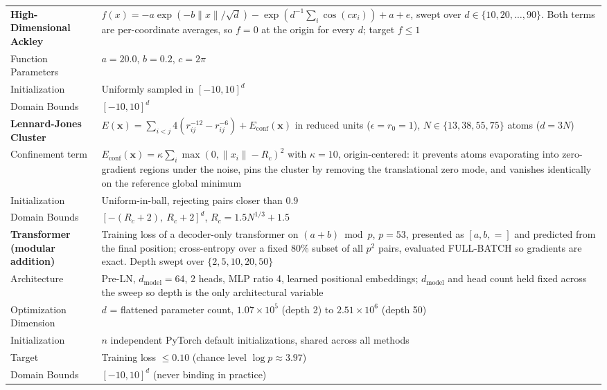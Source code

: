 \documentclass{article}
\theoremstyle{plain}
\theoremstyle{definition}
\theoremstyle{remark}
\newcommand{\xx}{\mathbf{x}}
\begin{document}
\begin{table}[!htbp]
\begin{tabular}{@{}lp{}@{}}
\midrule
\textbf{High-Dimensional Ackley} & $f(x)=-a\exp(-b\lVert x\rVert/\sqrt{d})-\exp(d^{-1}\sum_i\cos(cx_i))+a+e$, swept over $d\in\{10,20,\dots,90\}$. Both terms are per-coordinate averages, so $f=0$ at the origin for every $d$; target $f\le1$ \\
Function Parameters & $a=20.0$, $b=0.2$, $c=2\pi$ \\
Initialization & Uniformly sampled in $[-10, 10]^d$ \\
Domain Bounds & $[-10, 10]^d$ \\
\midrule
\textbf{Lennard-Jones Cluster} & $E(\xx) = \sum_{i<j} 4(r_{ij}^{-12} - r_{ij}^{-6}) + E_{\text{conf}}(\xx)$ in reduced units ($\epsilon=r_0=1$), $N \in \{13, 38, 55, 75\}$ atoms ($d=3N$) \\
Confinement term & $E_{\text{conf}}(\xx) = \kappa\sum_i \max(0,\|x_i\|-R_c)^2$ with $\kappa=10$, origin-centered: it prevents atoms evaporating into zero-gradient regions under the noise, pins the cluster by removing the translational zero mode, and vanishes identically on the reference global minimum \\
Initialization & Uniform-in-ball, rejecting pairs closer than 0.9 \\
Domain Bounds & $[-(R_c+2),\ R_c+2]^d$, $R_c = 1.5 N^{1/3} + 1.5$ \\
\midrule
\textbf{Transformer (modular addition)} & Training loss of a decoder-only transformer on $(a+b)\bmod p$, $p=53$, presented as $[a,b,{=}]$ and predicted from the final position; cross-entropy over a fixed $80\%$ subset of all $p^2$ pairs, evaluated FULL-BATCH so gradients are exact. Depth swept over $\{2,5,10,20,50\}$ \\
Architecture & Pre-LN, $d_{\text{model}}=64$, 2 heads, MLP ratio 4, learned positional embeddings; $d_{\text{model}}$ and head count held fixed across the sweep so depth is the only architectural variable \\
Optimization Dimension & $d$ = flattened parameter count, $1.07\times10^5$ (depth 2) to $2.51\times10^6$ (depth 50) \\
Initialization & $n$ independent PyTorch default initializations, shared across all methods \\
Target & Training loss $\le0.10$ (chance level $\log p\approx3.97$) \\
Domain Bounds & $[-10,10]^d$ (never binding in practice) \\
\bottomrule
\end{tabular}
\end{table}
\end{document}
